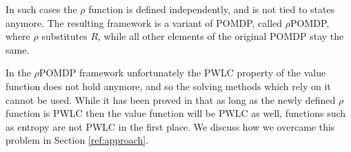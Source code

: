 In such cases the $\rho$ function is defined independently, and is not tied to states anymore. The
resulting framework is a variant of POMDP, called $\rho$POMDP, where $\rho$ substitutes $R$, while
all other elements of the original POMDP stay the same.

In the $\rho$POMDP framework unfortunately the PWLC property of the value function does not hold
anymore, and so the solving methods which rely on it cannot be used. While it has been proved in
\cite{cit:rpomdp} that as long as the newly defined $\rho$ function is PWLC then the value function
will be PWLC as well, functions such as entropy are not PWLC in the first place. We discuss how we
overcame this problem in Section \ref{ref:approach}.

%

